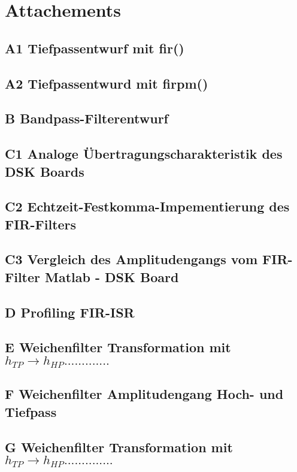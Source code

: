 \section{Attachements}

\subsection{A1 Tiefpassentwurf mit fir()}

\subsection{A2 Tiefpassentwurd mit firpm()}

\subsection{B Bandpass-Filterentwurf}

\subsection{C1 Analoge Übertragungscharakteristik des DSK Boards}

\subsection{C2 Echtzeit-Festkomma-Impementierung des FIR-Filters}


\subsection{C3 Vergleich des Amplitudengangs vom FIR-Filter Matlab - DSK Board}

\subsection{D Profiling FIR-ISR}

\subsection{E Weichenfilter Transformation mit $h_{TP} \rightarrow h_{HP} .............$}

\subsection{F Weichenfilter Amplitudengang Hoch- und Tiefpass}

\subsection{G Weichenfilter Transformation mit $h_{TP} \rightarrow h_{HP} ..............$}
 
